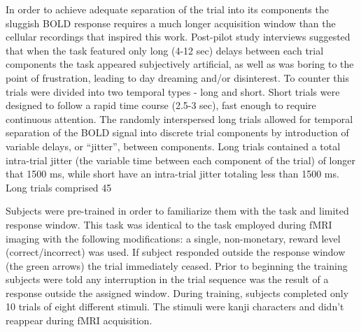 In order to achieve adequate separation of the trial into its components the sluggish BOLD response requires a much longer acquisition window than the cellular recordings that inspired this work.  Post-pilot study interviews suggested that when the task featured only long (4-12 sec) delays between each trial components the task appeared subjectively artificial, as well as was boring to the point of frustration, leading to day dreaming and/or disinterest.  To counter this trials were divided into two temporal types - long and short.   Short trials were designed to follow a rapid time course (2.5-3 sec), fast enough to require continuous attention.  The randomly interspersed long trials allowed for temporal separation of the BOLD signal into discrete trial components by introduction of variable delays, or “jitter”, between components. Long trials contained a total intra-trial jitter (the variable time between each component of the trial) of longer that 1500 ms, while short have an intra-trial jitter totaling less than 1500 ms.  Long trials comprised 45%

 Subjects were pre-trained in order to familiarize them with the task and limited response window.  This task was identical to the task employed during fMRI imaging with the following modifications:  a single, non-monetary, reward level (correct/incorrect) was used.  If subject responded outside the response window (the green arrows) the trial immediately ceased.  Prior to beginning the training subjects were told any interruption in the trial sequence was the result of a response outside the assigned window.   During training, subjects completed only 10 trials of eight different stimuli.  The stimuli were kanji characters and didn’t reappear during fMRI acquisition.



